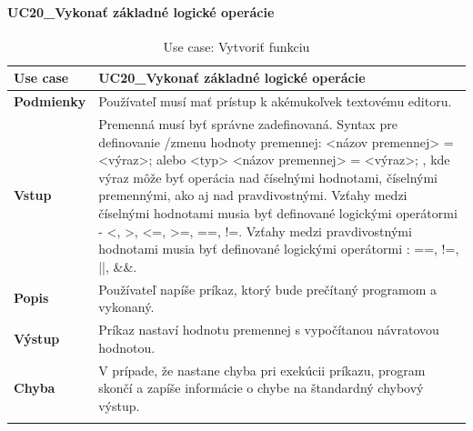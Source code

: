 \paragraph{UC20\_Vykonať základné logické operácie}
\begin{center}
	\begin{longtable}{|p{2.5cm}|p{12.2cm}|}
		
			\hline
			\textbf{Use case} & UC20\_Vykonať základné logické operácie\\ 
			\hline
			\textbf{Podmienky} & Používateľ musí mať prístup k akémukoľvek textovému editoru.  \\ 
			\hline
			\textbf{Vstup} & Premenná musí byť správne zadefinovaná. \newline
			Syntax pre definovanie /zmenu hodnoty premennej:  \newline
			<názov premennej> = <výraz>; alebo \newline
			<typ> <názov premennej> = <výraz>;
			\newline
			, kde výraz môže byť operácia nad číselnými hodnotami, číselnými premennými, ako aj nad pravdivostnými.\newline
			Vzťahy medzi číselnými hodnotami musia byť definované logickými operátormi - <, >, <=, >=, ==, !=.\newline
			Vzťahy medzi pravdivostnými hodnotami musia byť definované logickými operátormi : ==, !=, ||, \&\&.  \\
			\hline
			\textbf{Popis} & Používateľ napíše príkaz, ktorý bude prečítaný programom a vykonaný.\\ 
			\hline
			\textbf{Výstup} & Príkaz nastaví hodnotu premennej s vypočítanou návratovou hodnotou.\\
			\hline
			\textbf{Chyba} & V prípade, že nastane chyba pri exekúcii príkazu, program skončí a zapíše informácie o chybe na štandardný chybový výstup.\\
			\hline
		\caption{Use case: Vytvoriť funkciu}
		\label{table:1}
		
	\end{longtable}
\end{center}

